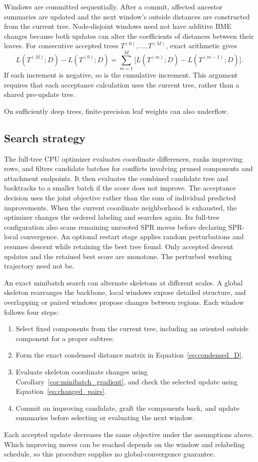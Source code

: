 \documentclass[11pt,a4paper]{article}
\makeatletter
\DeclareRobustCommand{\_}{\ifmmode\nfss@text{\textunderscore}\else\textunderscore\allowbreak\fi}
\theoremstyle{definition}
\makeatother
\begin{document}
Windows are committed sequentially.
After a commit, affected ancestor summaries are updated and the next window's outside distances are constructed from the current tree.
Node-disjoint windows need not have additive BME changes because both updates can alter the coefficients of distances between their leaves.
For consecutive accepted trees $T^{(0)},\ldots,T^{(M)}$, exact arithmetic gives
\begin{equation}
 L(T^{(M)};D)-L(T^{(0)};D)
 =\sum_{m=1}^M\bigl[L(T^{(m)};D)-L(T^{(m-1)};D)\bigr].
 \label{eq:telescoping}
\end{equation}
If each increment is negative, so is the cumulative increment.
This argument requires that each acceptance calculation uses the current tree, rather than a shared pre-update tree.

On sufficiently deep trees, finite-precision leaf weights can also underflow.

\subsection{Search strategy}
\label{sec:optimizer}

The full-tree CPU optimizer evaluates coordinate differences, ranks improving rows, and filters candidate batches for conflicts involving pruned components and attachment endpoints.
It then evaluates the combined candidate tree and backtracks to a smaller batch if the score does not improve.
The acceptance decision uses the joint objective rather than the sum of individual predicted improvements.
When the current coordinate neighborhood is exhausted, the optimizer changes the ordered labeling and searches again.
Its full-tree configuration also scans remaining unrooted SPR moves before declaring SPR-local convergence.
An optional restart stage applies random perturbations and resumes descent while retaining the best tree found.
Only accepted descent updates and the retained best score are monotone.
The perturbed working trajectory need not be.

An exact minibatch search can alternate skeletons at different scales.
A global skeleton rearranges the backbone, local windows expose detailed structure, and overlapping or paired windows propose changes between regions.
Each window follows four steps:
\begin{enumerate}
 \item Select fixed components from the current tree, including an oriented outside component for a proper subtree.
 \item Form the exact condensed distance matrix in Equation~\eqref{eq:condensed_D}.
 \item Evaluate skeleton coordinate changes using Corollary~\ref{cor:minibatch_gradient}, and check the selected update using Equation~\eqref{eq:changed_pairs}.
 \item Commit an improving candidate, graft the components back, and update summaries before selecting or evaluating the next window.
\end{enumerate}
Each accepted update decreases the same objective under the assumptions above.
Which improving moves can be reached depends on the window and relabeling schedule, so this procedure supplies no global-convergence guarantee.
\end{document}
